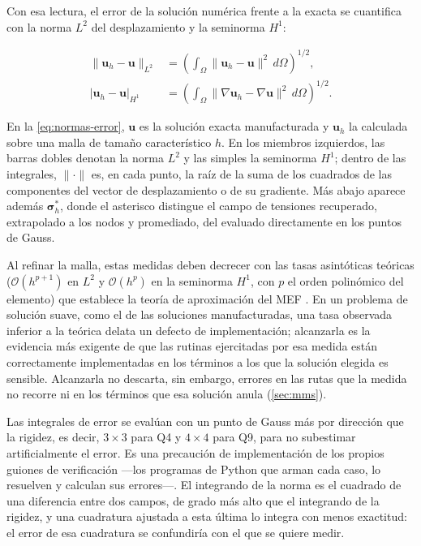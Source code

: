 Con esa lectura, el error de la solución numérica frente a la exacta se cuantifica con la norma $L^2$ del desplazamiento y la seminorma $H^1$:

\begin{equation}
\begin{aligned}
\|\bm{u}_h - \bm{u}\|_{L^2} &= \left( \int_\Omega \|\bm{u}_h - \bm{u}\|^2 \, d\Omega \right)^{1/2}, \\
|\bm{u}_h - \bm{u}|_{H^1} &= \left( \int_\Omega \|\nabla\bm{u}_h - \nabla\bm{u}\|^2 \, d\Omega \right)^{1/2}.
\end{aligned}
\label{eq:normas-error}
\end{equation}

En la \autoref{eq:normas-error}, $\bm{u}$ es la solución exacta manufacturada y $\bm{u}_h$ la calculada sobre una malla de tamaño característico $h$. En los miembros izquierdos, las barras dobles denotan la norma $L^2$ y las simples la seminorma $H^1$; dentro de las integrales, $\|\cdot\|$ es, en cada punto, la raíz de la suma de los cuadrados de las componentes del vector de desplazamiento o de su gradiente. Más abajo aparece además $\bm{\sigma}^*_h$, donde el asterisco distingue el campo de tensiones recuperado, extrapolado a los nodos y promediado, del evaluado directamente en los puntos de Gauss.

Al refinar la malla, estas medidas deben decrecer con las tasas asintóticas teóricas ($\mathcal{O}(h^{p+1})$ en $L^2$ y $\mathcal{O}(h^p)$ en la seminorma $H^1$, con $p$ el orden polinómico del elemento) que establece la teoría de aproximación del MEF \autocites[pp.~106-107]{strang2008analysis}[pp.~189-190]{hughes2000fem}. En un problema de solución suave, como el de las soluciones manufacturadas, una tasa observada inferior a la teórica delata un defecto de implementación; alcanzarla es la evidencia más exigente de que las rutinas ejercitadas por esa medida están correctamente implementadas en los términos a los que la solución elegida es sensible. Alcanzarla no descarta, sin embargo, errores en las rutas que la medida no recorre ni en los términos que esa solución anula (\autoref{sec:mms}).

Las integrales de error se evalúan con un punto de Gauss más por dirección que la rigidez, es decir, $3\times3$ para Q4 y $4\times4$ para Q9, para no subestimar artificialmente el error. Es una precaución de implementación de los propios guiones de verificación ---los programas de Python que arman cada caso, lo resuelven y calculan sus errores---. El integrando de la norma es el cuadrado de una diferencia entre dos campos, de grado más alto que el integrando de la rigidez, y una cuadratura ajustada a esta última lo integra con menos exactitud: el error de esa cuadratura se confundiría con el que se quiere medir.

